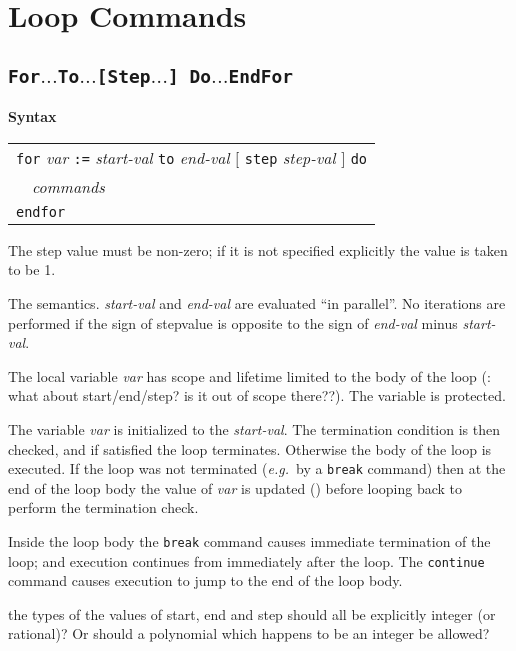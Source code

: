 \documentclass{book}[12,a4paper]
\def\eg{{\it e.g.}}
\def\mydots{$...$}
\newenvironment{syntax}
{\goodbreak\noindent\textbf{Syntax}\\
 \begin{tabular}{|p{0.9\textwidth}|}\hline}
{\\\hline\end{tabular}}
\begin{document}
\section{Loop Commands}

\subsection{\texttt{For\mydots To\mydots [Step\mydots] Do\mydots EndFor}}
\label{keyword:for}

\begin{syntax}
\texttt{for} \textit{var} \texttt{:=} \textit{start-val} \texttt{to}
\textit{end-val} $[$ \texttt{step} \textit{step-val} $]$ \texttt{do}\\
\ \ \textit{commands}\\
\texttt{endfor}
\end{syntax}

The step value must be non-zero; if it is not specified explicitly the value is taken to be 1.

The semantics.  \textit{start-val} and \textit{end-val} are evaluated ``in parallel''.
No iterations are performed if the sign of stepvalue is opposite to the sign of
\textit{end-val} minus \textit{start-val}.

The local variable \textit{var} has scope and lifetime limited to the body of the loop
(: what about start/end/step? is it out of scope there??).  The variable is
protected.

The variable \textit{var} is initialized to the \textit{start-val}.  The
termination condition is then checked, and if satisfied the loop
terminates.  Otherwise the body of the loop is executed.  If the loop was
not terminated (\eg~by a \texttt{break} command) then at the end of the loop
body the value of \textit{var} is updated () before looping back to perform the termination check.

Inside the loop body the \texttt{break} command causes immediate termination of the loop;
and execution continues from immediately after the loop.  The \texttt{continue} command
causes execution to jump to the end of the loop body.


 the types of the values of start, end and step should all be explicitly integer (or rational)?
Or should a polynomial which happens to be an integer be allowed?
\end{document}
